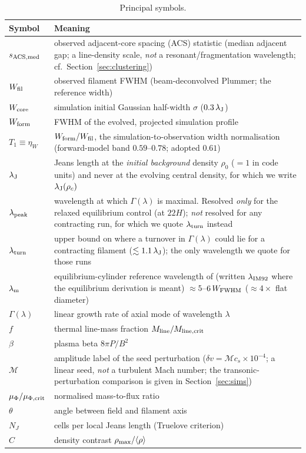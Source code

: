 \documentclass[usenatbib,twoside,twocolumn]{mnras}
\begin{document}
\begin{table}
\caption{Principal symbols.}
\label{tab:symbols}
\footnotesize
\setlength{\tabcolsep}{4pt}
\begin{tabular}{lp{6.1cm}}
\toprule
Symbol & Meaning \\
\midrule
$s_{\rm ACS,med}$ & observed adjacent-core spacing (ACS) statistic (median adjacent gap; a line-density scale, \emph{not} a resonant/fragmentation wavelength; cf.\ Section~\ref{sec:clustering}) \\
$W_{\rm fil}$ & observed filament FWHM (beam-deconvolved Plummer; the reference width) \\
$W_{\rm core}$ & simulation initial Gaussian half-width $\sigma$ ($0.3\,\lambda_{\rm J}$) \\
$W_{\rm form}$ & FWHM of the evolved, projected simulation profile \\
$T_1\!\equiv\!\eta_W$ & $W_{\rm form}/W_{\rm fil}$, the simulation-to-observation width normalisation (forward-model band $0.59$--$0.78$; adopted $0.61$) \\
$\lambda_{\rm J}$ & Jeans length at the \emph{initial background} density $\rho_0$ ($=1$ in code units) and never at the evolving central density, for which we write $\lambda_{\rm J}(\rho_c)$ \\
$\lambda_{\rm peak}$ & wavelength at which $\Gamma(\lambda)$ is maximal. Resolved \emph{only} for the relaxed equilibrium control (at $22H$); \emph{not} resolved for any contracting run, for which we quote $\lambda_{\rm turn}$ instead \\
$\lambda_{\rm turn}$ & upper bound on where a turnover in $\Gamma(\lambda)$ could lie for a contracting filament ($\lesssim1.1\,\lambda_{\rm J}$); the only wavelength we quote for those runs \\
$\lambda_{\rm m}$ & equilibrium-cylinder reference wavelength of \citet{Inutsuka1992} (written $\lambda_{\rm IM92}$ where the equilibrium derivation is meant) $\approx5$--$6\,W_{\rm FWHM}$ ($\approx4\times$ flat diameter) \\
$\Gamma(\lambda)$ & linear growth rate of axial mode of wavelength $\lambda$ \\
$f$ & thermal line-mass fraction $M_{\rm line}/M_{\rm line,crit}$ \\
$\beta$ & plasma beta $8\pi P/B^2$ \\
$\mathcal{M}$ & amplitude label of the seed perturbation ($\delta v=\mathcal{M}c_s\times10^{-4}$; a linear seed, \emph{not} a turbulent Mach number; the transonic-perturbation comparison is given in Section~\ref{sec:sims}) \\
$\mu_\Phi/\mu_{\Phi,\rm crit}$ & normalised mass-to-flux ratio \\
$\theta$ & angle between field and filament axis \\
$N_J$ & cells per local Jeans length (Truelove criterion) \\
$C$ & density contrast $\rho_{\rm max}/\langle\rho\rangle$ \\
\bottomrule
\end{tabular}
\end{table}
\end{document}
